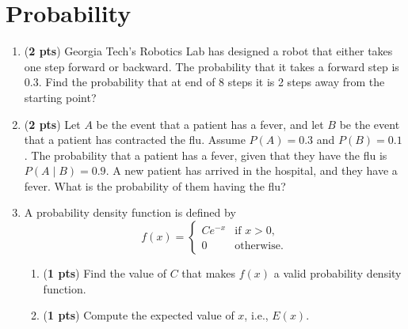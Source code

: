 \documentclass[11pt, letterpaper]{article}
\begin{document}
\newpage
\section{Probability}
\begin{enumerate}[label=(\alph*)]

\item (\textbf{2 pts}) Georgia Tech's Robotics Lab has designed a robot that either takes one step forward or backward. The probability that it takes a forward step is 0.3. Find the probability that at end of 8 steps it is 2 steps away from the starting point?


\item (\textbf{2 pts}) Let $A$ be the event that a patient has a fever, and let $B$ be the event that a patient has contracted the flu. Assume $P(A) = 0.3$ and $P(B) = 0.1$. The probability that a patient has a fever, given that they have the flu is $P(A\mid B) = 0.9$. A new patient has arrived in the hospital, and they have a fever. What is the probability of them having the flu?

    \item
        A probability density function is defined by
        $$
	        f(x)=
	        \begin{cases}
		        Ce^{-x} & \text{if } x>0, \\
		        0 & \text{otherwise}.
	        \end{cases}
        $$
        \begin{enumerate}[label=(\roman*)]
	        \item (\textbf{1 pts}) Find the value of $C$ that makes $f(x)$ a valid probability density function.
	        \item (\textbf{1 pts}) Compute the expected value of $x$, i.e., $E(x)$.
        \end{enumerate}



\end{enumerate}
\end{document}
